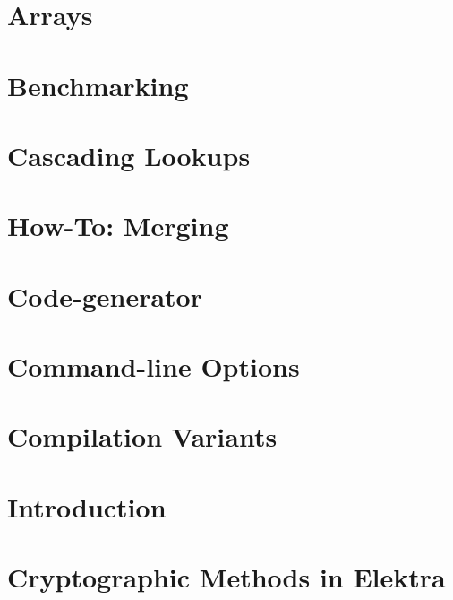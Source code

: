 \documentclass[twoside]{book}
\newcommand{\+}{\discretionary{\mbox{\scriptsize$\hookleftarrow$}}{}{}}
\begin{document}
\chapter{Arrays}
\label{doc_tutorials_arrays_md}

\chapter{Benchmarking}
\label{doc_tutorials_benchmarking_md}

\chapter{Cascading Lookups}
\label{doc_tutorials_cascading_md}

\chapter{How-\/\+To\+: Merging}
\label{doc_tutorials_cmerge_md}

\chapter{Code-\/generator}
\label{doc_tutorials_code-generator_md}

\chapter{Command-\/line Options}
\label{doc_tutorials_command-line-options_md}

\chapter{Compilation Variants}
\label{doc_tutorials_compilation-variants_md}

\chapter{Introduction}
\label{doc_tutorials_contributing-clion_md}

\chapter{Cryptographic Methods in Elektra}
\label{doc_tutorials_crypto_md}

\end{document}
